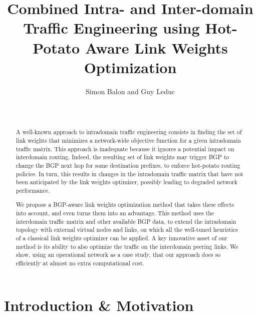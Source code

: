 \documentclass{acm_proc_article-sp}
\begin{document}
\title{Combined Intra- and Inter-domain Traffic Engineering using Hot-Potato Aware Link Weights Optimization}

\author{
\alignauthor Simon Balon and Guy Leduc\\
       \\
       \\
}

\maketitle
\begin{abstract}

A well-known approach to intradomain traffic engineering consists in
finding the set of link weights that minimizes a network-wide
objective function for a given intradomain traffic matrix. This
approach is inadequate because it ignores a potential
impact on interdomain routing. Indeed, the resulting set of link
weights may trigger BGP to change the BGP next hop for some
destination prefixes, to enforce hot-potato routing policies. In turn,
this results in changes in the intradomain traffic matrix that have
not been anticipated by the link weights optimizer, possibly leading
to degraded network performance.

We propose a BGP-aware link weights optimization method that takes these effects
into account, and even turns them into an advantage. This method uses
the interdomain traffic matrix and other available BGP data, to extend
the intradomain topology with external virtual nodes and links, on
which all the well-tuned heuristics of a classical link weights
optimizer can be applied. A key innovative asset of our method is its
ability to also optimize the traffic on the interdomain peering
links. We show, using an operational network as a case study, that our
approach does so efficiently at almost no extra computational cost.

\end{abstract}

\section{Introduction \& Motivation}
\label{sec:intro}
\end{document}
